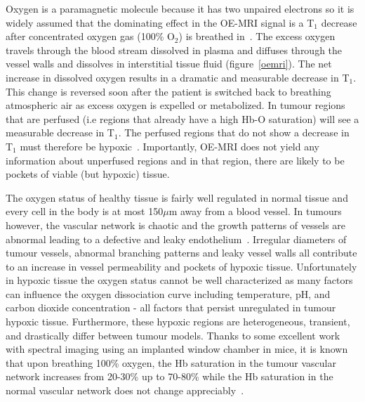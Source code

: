Oxygen is a paramagnetic molecule because it has two unpaired electrons so it is widely assumed that the dominating effect in the OE-MRI signal is a T$_1$ decrease after concentrated oxygen gas (100\% O$_2$) is breathed in~\cite{OConnor:2016ee,Linnik:2014hf}. 
The excess oxygen travels through the blood stream dissolved in plasma and diffuses through the vessel walls and dissolves in interstitial tissue fluid (figure~\ref{oemri}).
The net increase in dissolved oxygen results in a dramatic and measurable decrease in T$_1$. 
This change is reversed soon after the patient is switched back to breathing atmospheric air as excess oxygen is expelled or metabolized. 
In tumour regions that are perfused (i.e regions that already have a high Hb-O saturation) will see a measurable decrease in T$_1$. 
The perfused regions that do not show a decrease in T$_1$ must therefore be hypoxic~\cite{OConnor:2016ee}. 
Importantly, OE-MRI does not yield any information about unperfused regions and in that region, there are likely to be pockets of viable (but hypoxic) tissue.

The oxygen status of healthy tissue is fairly well regulated in normal tissue and every cell in the body is at most 150$\mu$m away from a blood vessel. 
In tumours however, the vascular network is chaotic and the growth patterns of vessels are abnormal leading to a defective and leaky endothelium~\cite{McDonald:2002}. 
Irregular diameters of tumour vessels, abnormal branching patterns and leaky vessel walls all contribute to an increase in vessel permeability and pockets of hypoxic tissue. 
Unfortunately in hypoxic tissue the oxygen status cannot be well characterized as many factors can influence the oxygen dissociation curve including temperature, pH, and carbon dioxide concentration - all factors that persist unregulated in tumour hypoxic tissue. 
Furthermore, these hypoxic regions are heterogeneous, transient, and drastically differ between tumour models. 
Thanks to some excellent work with spectral imaging using an implanted window chamber in mice, it is known that upon breathing 100\% oxygen, the Hb saturation in the tumour vascular network increases from 20-30\% up to 70-80\% while the Hb saturation in the normal vascular network does not change appreciably~\cite{Sorg:2008eg}.

